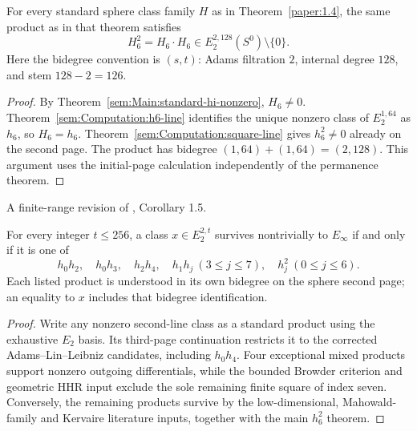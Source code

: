 \begin{theorem}
\label{sem:Main:h6-square-e2-nonzero}
For every standard sphere class family $H$ as in
Theorem~\ref{paper:1.4}, the same product as in that theorem satisfies
\[
 H_6^2=H_6\cdot H_6\in E_2^{2,128}(S^0)\setminus\{0\}.
\]
Here the bidegree convention is $(s,t)$: Adams filtration $2$,
internal degree $128$, and stem $128-2=126$.
\end{theorem}
\begin{proof}
By Theorem~\ref{sem:Main:standard-hi-nonzero}, $H_6\ne0$.
Theorem~\ref{sem:Computation:h6-line} identifies the unique nonzero
class of $E_2^{1,64}$ as $h_6$, so $H_6=h_6$.
Theorem~\ref{sem:Computation:square-line} gives $h_6^2\ne0$ already
on the second page. The product has bidegree
$(1,64)+(1,64)=(2,128)$. This argument uses the initial-page
calculation independently of the permanence theorem.
\end{proof}

\begin{corollary}
\label{sem:Main:finite-two-line-classification}
A finite-range revision of \cite{LWX126}, Corollary 1.5.\par
For every integer $t\leq256$, a class $x\in E_2^{2,t}$ survives
nontrivially to $E_\infty$ if and only if it is one of
\[
 h_0h_2,\quad h_0h_3,\quad h_2h_4,\quad h_1h_j\ (3\leq j\leq7),\quad h_j^2\ (0\leq j\leq6).
\]
Each listed product is understood in its own bidegree on the sphere
second page; an equality to $x$ includes that bidegree identification.
\end{corollary}
\begin{proof}
Write any nonzero second-line class as a standard product using the exhaustive $E_2$ basis. Its third-page continuation restricts it to the corrected Adams--Lin--Leibniz candidates, including $h_0h_4$. Four exceptional mixed products support nonzero outgoing differentials, while the bounded Browder criterion and geometric HHR input exclude the sole remaining finite square of index seven. Conversely, the remaining products survive by the low-dimensional, Mahowald-family and Kervaire literature inputs, together with the main $h_6^2$ theorem.
\end{proof}

